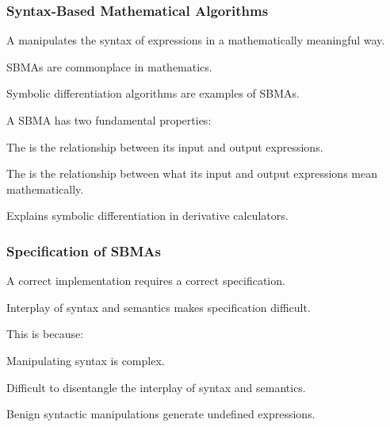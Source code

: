 \documentclass[t,12pt,numbers,fleqn]{beamer}
\begin{document}
\begin{frame}
\frametitle{Syntax-Based Mathematical Algorithms}
\bi

  \item A 
    manipulates the syntax of expressions in a mathematically
    meaningful way.

  \bi

    \item SBMAs are commonplace in mathematics.

    \item Symbolic differentiation algorithms are examples of SBMAs.

  \ei

\pause

  \item A SBMA has two fundamental properties:

  \be

    \item The  is the relationship
      between its input and output expressions.

    \item The  is the relationship between
      what its input and output expressions mean mathematically.

  \ee

\pause

  \item Explains symbolic differentiation in derivative calculators.

\ei
\end{frame}


\begin{frame}
\frametitle{Specification of SBMAs}
\bi

  \item A correct implementation requires a correct specification.

  \item Interplay of syntax and semantics makes specification
    difficult.

  \item This is because:

  \be

    \item Manipulating syntax is complex.

    \item Difficult to disentangle the interplay of syntax
      and semantics.

    \item Benign syntactic manipulations generate undefined
      expressions.

  \ee

\ei
\end{frame}
\end{document}
